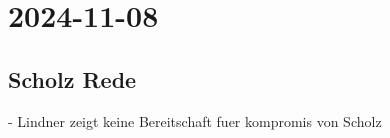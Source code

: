 \section{2024-11-08}

\subsection{Scholz Rede}

- Lindner zeigt keine Bereitschaft fuer kompromis von Scholz
